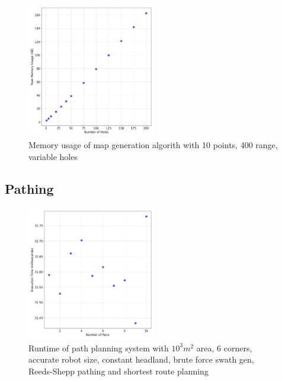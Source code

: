 \documentclass[final]{cmpreport_02}
\begin{document}
\begin{figure}[h!]
	\centering
	\includegraphics[width=0.5\textwidth]{./images/mapGenHolesMem.png}
	\caption{Memory usage of map generation algorith with 10 points, 400 range, variable holes}
	\label{PE:mg:memHoles}
\end{figure}


\subsection{Pathing}
\begin{figure}[h!]
	\centering
	\includegraphics[width=0.5\textwidth]{./images/pathingBaseLineRT.png}
	\caption{Runtime of path planning system with $10^3m^2$ area, 6 corners, accurate robot size, constant headland, brute force swath gen, Reeds-Shepp pathing and shortest route planning}
	\label{PE:p:BaselineRT}
\end{figure}
\end{document}
